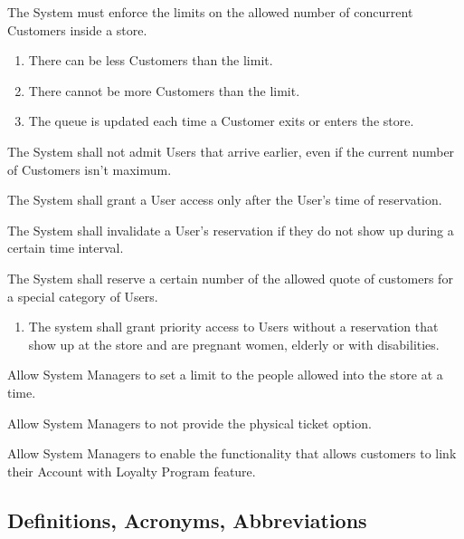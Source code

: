 \begin{enumerate}[label={[G\arabic*]}]
    \item {}The System must enforce the limits on the allowed number of concurrent Customers inside a store.
        \begin{enumerate}
            \item There can be less Customers than the limit.
            \item There cannot be more Customers than the limit.
            \item The queue is updated each time a Customer exits or enters the store.
        \end{enumerate}
    \item The System shall not admit Users that arrive earlier, even if the current number of Customers isn't maximum.
    \item {}The System shall grant a User access only after the User's time of reservation.
    \item The System shall invalidate a User's reservation if they do not show up during a certain time interval.
    \item The System shall reserve a certain number of the allowed quote of customers for a special category of Users.
        \begin{enumerate}
            \item The system shall grant priority access to Users without a reservation that show up at the store and are pregnant women, elderly or with disabilities.
        \end{enumerate}
    \item Allow System Managers to set a limit to the people allowed into the store at a time.
    \item Allow System Managers to not provide the physical ticket option.
    \item Allow System Managers to enable the functionality that allows customers to link their Account with Loyalty Program feature.
\end{enumerate}

\subsection{Definitions, Acronyms, Abbreviations}

